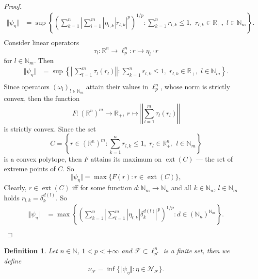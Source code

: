 \documentclass[12pt]{article}
\newtheorem{definition}[theorem]{Definition}
\begin{document}
\begin{proof}
\[\begin{aligned}
        \Vert \psi_{\eta}\Vert
        &=\sup\left\{
            \left(\sum_{k=1}^n
                \left|\sum_{l=1}^{m}|\eta_{l,k}| r_{l,k}\right|^p
            \right)^{1/p}:
            \sum_{k=1}^n r_{l,k}\leq 1,\,\, 
            r_{l,k}\in\mathbb{R}_+,\,\, 
            l\in\mathbb{N}_m
        \right\}. \\
    \end{aligned}
    \]
    Consider linear operators
    \[
        \tau_l:\mathbb{R}^n\to\ell_p^n: r\mapsto \eta_l\cdot r
    \]
    for $l\in\mathbb{N}_m$. Then 
    \[
    \begin{aligned}
        \Vert\psi_{\eta}\Vert
        &=\sup\left\{
            \left\Vert\sum_{l=1}^m\tau_l(r_l)\right\Vert:
            \sum_{k=1}^n r_{l,k}\leq 1,\,\, 
            r_{l,k}\in\mathbb{R}_+,\,\, 
            l\in\mathbb{N}_m
        \right\}. \\
    \end{aligned}
    \]
    Since operators $(\omega_l)_{l\in\mathbb{N}_m}$ attain their values 
    in $\ell_{p}^n$, whose norm is strictly convex, then the function
    \[
        F:(\mathbb{R}^n)^m\to\mathbb{R}_+,\, 
        r\mapsto \left\Vert\sum_{l=1}^m \tau_l(r_l)\right\Vert
    \]
    is strictly convex. Since the set
    \[
        C=\left\{ 
            r\in(\mathbb{R}^n)^m :
            \sum_{k=1}^n r_{l,k}\leq 1,\,\, 
            r_l\in\mathbb{R}^n_+,\,\, 
            l\in\mathbb{N}_m
        \right\}
    \]
    is a convex polytope, then $F$ attains its maximum 
    on $\operatorname{ext}(C)$ --- the set of extreme points of $C$. So
    \[
        \Vert\psi_\eta\Vert=\max\{F(r) : r\in \operatorname{ext}(C)\},
    \]
    Clearly, $r\in \operatorname{ext}(C)$ iff for some 
    function $d:\mathbb{N}_m\to\mathbb{N}_n$ and 
    all $k\in\mathbb{N}_n$, $l\in\mathbb{N}_m$ 
    holds $r_{l,k}=\delta_{k}^{d(l)}$. So 
    \[
    \begin{aligned}
        \Vert\psi_{\eta}\Vert
        &=\max\left\{
            \left(\sum_{k=1}^n
                \left|\sum_{l=1}^{m}|\eta_{l,k}| \delta_{k}^{d(l)}\right|^p
            \right)^{1/p}:
            d\in(\mathbb{N}_n)^{\mathbb{N}_m}
        \right\}. \\
    \end{aligned}
    \]
\end{proof}

\begin{definition}\label{ExtMorphsNormInf}
    Let $n\in\mathbb{N}$, $1<p<+\infty$ and $\mathcal{F}\subset \ell_{p^*}^n$ is 
    a finite set, then we define
    \[
        \nu_{\mathcal{F}}=\inf\{
            \Vert \psi_{\eta} \Vert : \eta\in\mathcal{N}_{\mathcal{F}}
        \}.
    \]
\end{definition}
\end{document}
